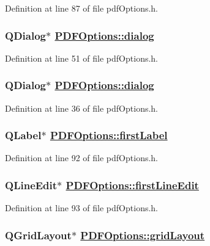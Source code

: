 Definition at line 87 of file pdf\-Options.h.\hypertarget{classPDFOptions_r14}{
\subsubsection[dialog]{\setlength{\rightskip}{0pt plus 5cm}QDialog$\ast$ \hyperlink{classPDFOptions_r1}{PDFOptions::dialog}}}
\label{classPDFOptions_r14}


Definition at line 51 of file pdf\-Options.h.\hypertarget{classPDFOptions_r1}{
\subsubsection[dialog]{\setlength{\rightskip}{0pt plus 5cm}QDialog$\ast$ \hyperlink{classPDFOptions_r1}{PDFOptions::dialog}}}
\label{classPDFOptions_r1}


Definition at line 36 of file pdf\-Options.h.\hypertarget{classPDFOptions_r49}{
\subsubsection[firstLabel]{\setlength{\rightskip}{0pt plus 5cm}QLabel$\ast$ \hyperlink{classPDFOptions_r49}{PDFOptions::first\-Label}}}
\label{classPDFOptions_r49}


Definition at line 92 of file pdf\-Options.h.\hypertarget{classPDFOptions_r50}{
\subsubsection[firstLineEdit]{\setlength{\rightskip}{0pt plus 5cm}QLine\-Edit$\ast$ \hyperlink{classPDFOptions_r50}{PDFOptions::first\-Line\-Edit}}}
\label{classPDFOptions_r50}


Definition at line 93 of file pdf\-Options.h.\hypertarget{classPDFOptions_r48}{
\subsubsection[gridLayout]{\setlength{\rightskip}{0pt plus 5cm}QGrid\-Layout$\ast$ \hyperlink{classPDFOptions_r48}{PDFOptions::grid\-Layout}}}
\label{classPDFOptions_r48}


